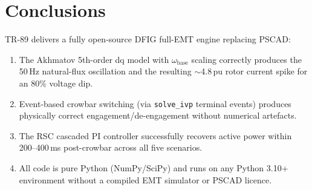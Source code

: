 \documentclass[11pt,a4paper]{article}
\begin{document}
\section{Conclusions}

TR-89 delivers a fully open-source DFIG full-EMT engine replacing PSCAD:

\begin{enumerate}
  \item The Akhmatov 5th-order dq model with $\omega_\text{base}$ scaling
        correctly produces the 50\,Hz natural-flux oscillation and the
        resulting $\sim$4.8\,pu rotor current spike for an 80\% voltage dip.
  \item Event-based crowbar switching (via \texttt{solve\_ivp} terminal events)
        produces physically correct engagement/de-engagement without
        numerical artefacts.
  \item The RSC cascaded PI controller successfully recovers active power
        within 200--400\,ms post-crowbar across all five scenarios.
  \item All code is pure Python (NumPy/SciPy) and runs on any Python 3.10+
        environment without a compiled EMT simulator or PSCAD licence.
\end{enumerate}
\end{document}
